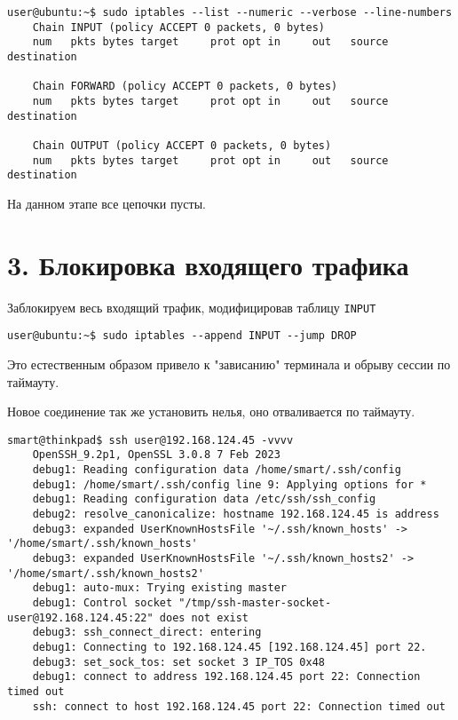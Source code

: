 \begin{Verbatim}[frame=single,breaklines=true,breakanywhere=true]
    user@ubuntu:~$ sudo iptables --list --numeric --verbose --line-numbers
    Chain INPUT (policy ACCEPT 0 packets, 0 bytes)
    num   pkts bytes target     prot opt in     out   source    destination

    Chain FORWARD (policy ACCEPT 0 packets, 0 bytes)
    num   pkts bytes target     prot opt in     out   source    destination

    Chain OUTPUT (policy ACCEPT 0 packets, 0 bytes)
    num   pkts bytes target     prot opt in     out   source    destination
\end{Verbatim}

На данном этапе все цепочки пусты.

\section*{3. Блокировка входящего трафика}

Заблокируем весь входящий трафик, модифицировав таблицу \texttt{INPUT}

\begin{Verbatim}[frame=single,breaklines=true,breakanywhere=true]
    user@ubuntu:~$ sudo iptables --append INPUT --jump DROP
\end{Verbatim}

Это естественным образом привело к "зависанию" терминала и обрыву сессии по таймауту.

Новое соединение так же установить нелья, оно отваливается по таймауту.

\begin{Verbatim}[frame=single,breaklines=true,breakanywhere=true]
    smart@thinkpad$ ssh user@192.168.124.45 -vvvv
    OpenSSH_9.2p1, OpenSSL 3.0.8 7 Feb 2023
    debug1: Reading configuration data /home/smart/.ssh/config
    debug1: /home/smart/.ssh/config line 9: Applying options for *
    debug1: Reading configuration data /etc/ssh/ssh_config
    debug2: resolve_canonicalize: hostname 192.168.124.45 is address
    debug3: expanded UserKnownHostsFile '~/.ssh/known_hosts' -> '/home/smart/.ssh/known_hosts'
    debug3: expanded UserKnownHostsFile '~/.ssh/known_hosts2' -> '/home/smart/.ssh/known_hosts2'
    debug1: auto-mux: Trying existing master
    debug1: Control socket "/tmp/ssh-master-socket-user@192.168.124.45:22" does not exist
    debug3: ssh_connect_direct: entering
    debug1: Connecting to 192.168.124.45 [192.168.124.45] port 22.
    debug3: set_sock_tos: set socket 3 IP_TOS 0x48
    debug1: connect to address 192.168.124.45 port 22: Connection timed out
    ssh: connect to host 192.168.124.45 port 22: Connection timed out
\end{Verbatim}

